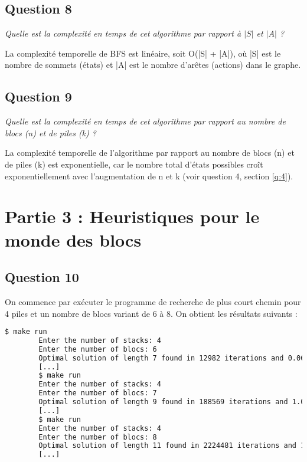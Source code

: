 \subsection{Question 8}

\textit{Quelle est la complexité en temps de cet algorithme par rapport à $|S|$ et $|A|$ ?}

La complexité temporelle de BFS est linéaire, soit O(|S| + |A|), où |S| est le nombre de sommets (états) et |A| est le nombre d'arêtes (actions) dans le graphe.

\subsection{Question 9}

\textit{Quelle est la complexité en temps de cet algorithme par rapport au nombre de blocs (n) et de piles (k) ?}

La complexité temporelle de l'algorithme par rapport au nombre de blocs (n) et de piles (k) est exponentielle, car le nombre total d'états possibles croît exponentiellement avec l'augmentation de n et k (voir question 4, section \ref{q:4}).

\section{Partie 3 : Heuristiques pour le monde des blocs}

\subsection{Question 10}

On commence par exécuter le programme de recherche de plus court chemin pour 4 piles et un nombre de blocs variant de 6 à 8. On obtient les résultats suivants :

\begin{minipage}{\dimexpr\linewidth-20pt}
    \begin{lstlisting}[language=bash, caption={Résultats de l'exécution du programme de recherche de plus court chemin}, label={lst:plus_court_chemin_results_no_heuristics}]
        $ make run
        Enter the number of stacks: 4
        Enter the number of blocs: 6
        Optimal solution of length 7 found in 12982 iterations and 0.060902 seconds
        [...]
        $ make run
        Enter the number of stacks: 4
        Enter the number of blocs: 7
        Optimal solution of length 9 found in 188569 iterations and 1.04769 seconds
        [...]
        $ make run
        Enter the number of stacks: 4
        Enter the number of blocs: 8
        Optimal solution of length 11 found in 2224481 iterations and 15.6446 seconds
        [...]
    \end{lstlisting}
\end{minipage}

